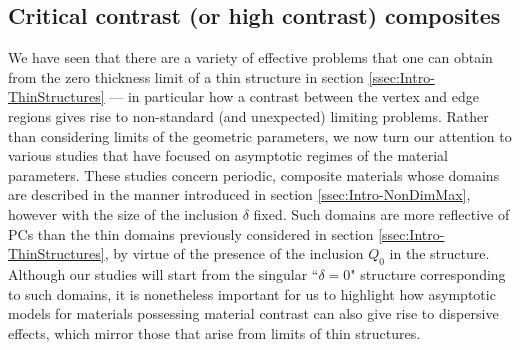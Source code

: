 \subsection{Critical contrast (or high contrast) composites} \label{ssec:Intro-CritContrast}
We have seen that there are a variety of effective problems that one can obtain from the zero thickness limit of a thin structure in section \ref{ssec:Intro-ThinStructures} --- in particular how a contrast between the vertex and edge regions gives rise to non-standard (and unexpected) limiting problems.
Rather than considering limits of the geometric parameters, we now turn our attention to various studies that have focused on asymptotic regimes of the material parameters.
These studies concern periodic, composite materials whose domains are described in the manner introduced in section \ref{ssec:Intro-NonDimMax}, however with the size of the inclusion $\delta$ fixed.
Such domains are more reflective of PCs than the thin domains previously considered in section \ref{ssec:Intro-ThinStructures}, by virtue of the presence of the inclusion $Q_0$ in the structure. 
Although our studies will start from the singular ``$\delta=0$" structure corresponding to such domains, it is nonetheless important for us to highlight how asymptotic models for materials possessing material contrast can also give rise to dispersive effects, which mirror those that arise from limits of thin structures.

